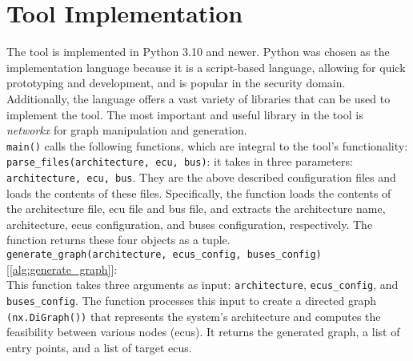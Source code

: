 \section{Tool Implementation}
\label{sec:implementation}

The tool is implemented in Python 3.10 and newer.
Python was chosen as the implementation language because it is a script-based language, allowing for quick prototyping and development,
and is popular in the security domain.
Additionally, the language offers a vast variety of libraries that can be used to implement the tool.
The most important and useful library in the tool is \textit{networkx} for graph manipulation and generation.\\

\texttt{main()} calls the following functions, which are integral to the tool's functionality:\\

\texttt{parse\_files(architecture, ecu, bus)}: it takes in three parameters: \texttt{architecture, ecu, bus}.
They are the above described configuration files and loads the contents of these files. 
Specifically, the function loads the contents of the architecture file, \acrshort{ecu} file and bus file, 
and extracts the architecture name, architecture, \acrshort{ecu}s configuration, and buses configuration, respectively. 
The function returns these four objects as a tuple.\\

\texttt{generate\_graph(architecture, ecus\_config, buses\_config)} [\ref{alg:generate_graph}]:\\
This function takes three arguments as input: 
\texttt{architecture}, \texttt{ecus\_config}, and \texttt{buses\_config}. 
The function processes this input to create a directed graph \texttt{(nx.DiGraph())} 
that represents the system's architecture and computes the feasibility between various nodes (\acrshort{ecu}s). 
It returns the generated graph, a list of entry points, and a list of target \acrshort{ecu}s.

